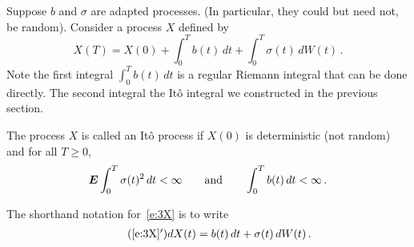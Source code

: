 Suppose $b$ and $\sigma$ are adapted processes.
(In particular, they could but need not, be random).
Consider a process $X$ defined by
\begin{equation}\label{e:3X}
  X(T) = X(0) + \int_0^T b(t) \, dt + \int_0^T \sigma(t) \, dW(t)\,.
\end{equation}
Note the first integral $\int_0^T b(t) \, dt$ is a regular Riemann integral that can be done directly.
The second integral the It\^o integral we constructed in the previous section.

\begin{definition}
  The process $X$ is called an It\^o process if $X(0)$ is deterministic (not random) and for all $T \geq 0$,
  \begin{equation*}
    \bm{E} \int_0^T \sigma(t)^2 \, dt < \infty
    \qquad\text{and}\qquad
    \int_0^T b(t) \, dt < \infty\,.
  \end{equation*}
\end{definition}

\begin{remark}
  The shorthand notation for~\eqref{e:3X} is to write
  \begin{gather}\label{e:3Xd}
    \tag{\ref{e:3X}$'$}
    dX(t) = b(t) \, dt + \sigma(t) \, dW(t)\,.
  \end{gather}
\end{remark}

